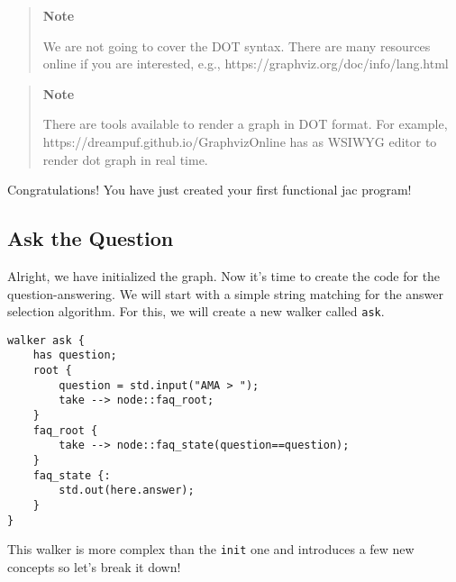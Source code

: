 \begin{quote}
\textbf{Note}

We are not going to cover the DOT syntax. There are many resources
online if you are interested, e.g.,
https://graphviz.org/doc/info/lang.html
\end{quote}

\begin{quote}
\textbf{Note}

There are tools available to render a graph in DOT format. For example,
https://dreampuf.github.io/GraphvizOnline has as WSIWYG editor to render
dot graph in real time.
\end{quote}

Congratulations! You have just created your first functional jac
program!

\hypertarget{ask-the-question}{%
\subsection{Ask the Question}\label{ask-the-question}}

Alright, we have initialized the graph. Now it's time to create the code
for the question-answering. We will start with a simple string matching
for the answer selection algorithm. For this, we will create a new
walker called \passthrough{\lstinline!ask!}.

\begin{lstlisting}
walker ask {
    has question;
    root {
        question = std.input("AMA > ");
        take --> node::faq_root;
    }
    faq_root {
        take --> node::faq_state(question==question);
    }
    faq_state {:
        std.out(here.answer);
    }
}
\end{lstlisting}

This walker is more complex than the \passthrough{\lstinline!init!} one
and introduces a few new concepts so let's break it down!


